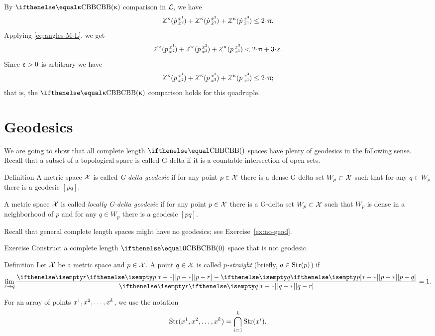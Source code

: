 By $\Alex\kappa$ comparison in $\mathcal{L}$,
we have
\[\angk\kappa {\hat{p}}{\hat{x}^1}{\hat{x}^2}
+\angk\kappa {\hat{p}}{\hat{x}^2}{\hat{x}^3}
+\angk\kappa {\hat{p}}{\hat{x}^3}{\hat{x}^1}
\le 
2\cdot\pi.\]
Applying  \ref{eq:angles-M-L}, 
we get 
\[\angk\kappa p{x^1}{x^2}
+\angk\kappa p{x^2}{x^3}
+\angk\kappa p{x^3}{x^1}< 2\cdot\pi+3\cdot\eps.\]
Since $\upvarepsilon>0$ is arbitrary we have 
\[\angk\kappa p{x^1}{x^2}
+\angk\kappa p{x^2}{x^3}
+\angk\kappa p{x^3}{x^1}\le 2\cdot\pi;\]
that is,
the $\Alex\kappa$ comparison holds for this quadruple.
\qeds

\section{Geodesics}

We are going to show that all complete length $\Alex{}$ spaces have plenty of geodesics in the following sense. Recall that a subset of a topological space is called G-delta if it is a countable intersection of open sets.

\begin{thm}{Definition}\label{def:alm-geod}
A metric space $\mathcal{X}$ is called \emph{G-delta geodesic} 
if for any point $p\in \spc{X}$ there is a dense G-delta set $W_p\subset\spc{X}$ such that for any $q\in W_p$ there is a geodesic $[p q]$.

A metric space $\mathcal{X}$ is called {}\emph{locally G-delta geodesic} 
if for any point $p\in \spc{X}$ there is a G-delta set $W_p\subset\spc{X}$ such that
$W_p$ is dense in a neighborhood of $p$ 
and for any $q\in W_p$ there is a geodesic $[p q]$.
\end{thm}

Recall that general complete length spaces might have no geodesics;
see Exercise~\ref{ex:no-geod}.

\begin{thm}{Exercise}\label{ex:nongeod-cbb}
Construct a complete length $\Alex0$ space that is not geodesic.
\end{thm}

\begin{thm}{Definition}\label{def:straight}
Let $\mathcal{X}$ be a metric space 
and $p\in \spc{X}$.
A point $q\in \spc{X}$ is called \emph{$p$-straight} (briefly, $q\in \Str(p)$) if
\[\limsup_{r\to q}\frac{\dist{p}{r}{}-\dist{p}{q}{}}{\dist{q}{r}{}}=1.\]

For an array of points $x^1,x^2,\dots,x^\kay$, 
we use the notation
\[\Str(x^1,x^2,\dots,x^\kay)=\bigcap_{i=1}^\kay\Str(x^i).\]
\end{thm}

